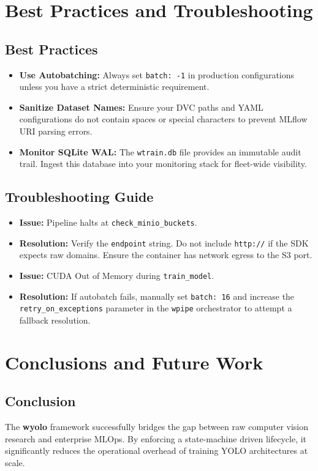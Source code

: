 \documentclass[12pt,a4paper]{report}
\begin{document}
\chapter{Best Practices and Troubleshooting}
\cleardoublepage
\section{Best Practices}
\begin{itemize}
    \item \textbf{Use Autobatching:} Always set \texttt{batch: -1} in production configurations unless you have a strict deterministic requirement.
    \item \textbf{Sanitize Dataset Names:} Ensure your DVC paths and YAML configurations do not contain spaces or special characters to prevent MLflow URI parsing errors.
    \item \textbf{Monitor SQLite WAL:} The \texttt{wtrain.db} file provides an immutable audit trail. Ingest this database into your monitoring stack for fleet-wide visibility.
\end{itemize}

\section{Troubleshooting Guide}
\begin{itemize}
    \item \textbf{Issue:} Pipeline halts at \texttt{check\_minio\_buckets}.
    \item \textbf{Resolution:} Verify the \texttt{endpoint} string. Do not include \texttt{http://} if the SDK expects raw domains. Ensure the container has network egress to the S3 port.
    \item \textbf{Issue:} CUDA Out of Memory during \texttt{train\_model}.
    \item \textbf{Resolution:} If autobatch fails, manually set \texttt{batch: 16} and increase the \texttt{retry\_on\_exceptions} parameter in the \texttt{wpipe} orchestrator to attempt a fallback resolution.
\end{itemize}

\chapter{Conclusions and Future Work}
\cleardoublepage
\section{Conclusion}
The \textbf{wyolo} framework successfully bridges the gap between raw computer vision research and enterprise MLOps. By enforcing a state-machine driven lifecycle, it significantly reduces the operational overhead of training YOLO architectures at scale.
\end{document}
